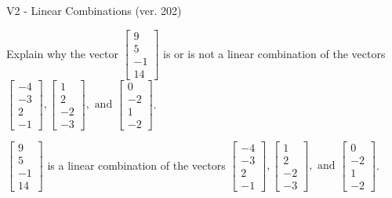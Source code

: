 \begin{exercise}
  \begin{exerciseTitle}V2 - Linear Combinations (ver. 202)\end{exerciseTitle}
  \begin{exerciseStatement}
    Explain why the vector \(\left[\begin{array}{c}
9 \\
5 \\
-1 \\
14
\end{array}\right]\)  is or is not a linear 
	combination of the vectors \(\left[\begin{array}{c}
-4 \\
-3 \\
2 \\
-1
\end{array}\right] , \left[\begin{array}{c}
1 \\
2 \\
-2 \\
-3
\end{array}\right] , \text{ and } \left[\begin{array}{c}
0 \\
-2 \\
1 \\
-2
\end{array}\right]\).
	


  \end{exerciseStatement}
  \begin{exerciseAnswer}
   \(\left[\begin{array}{c}
9 \\
5 \\
-1 \\
14
\end{array}\right]\) 
  	 is  
	a linear combination of the vectors \(\left[\begin{array}{c}
-4 \\
-3 \\
2 \\
-1
\end{array}\right] , \left[\begin{array}{c}
1 \\
2 \\
-2 \\
-3
\end{array}\right] , \text{ and } \left[\begin{array}{c}
0 \\
-2 \\
1 \\
-2
\end{array}\right]\).

	
  


  \end{exerciseAnswer}
\end{exercise}